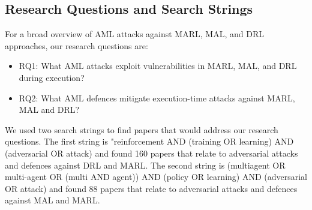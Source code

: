 \documentclass[conference,compsoc]{IEEEtran}
\begin{document}
\subsection{Research Questions and Search Strings}
For a broad overview of AML attacks against MARL, MAL, and DRL approaches, our research questions are:
\begin{itemize}
    \item RQ1: What AML attacks exploit vulnerabilities in MARL, MAL, and DRL during execution?
    \item RQ2: What AML defences mitigate execution-time attacks against MARL, MAL and DRL? 
\end{itemize}






We used two search strings to find papers that would address our research questions.
The first string  is {\ttfamily "reinforcement AND (training OR learning) AND (adversarial OR attack)} and found 160  papers that relate to adversarial attacks and defences against DRL and MARL.
The second string  is {\ttfamily (multiagent OR multi-agent OR (multi AND agent)) AND (policy OR learning) AND (adversarial OR attack)} and found 88 papers that relate to adversarial attacks and defences against MAL and MARL. 
\end{document}
